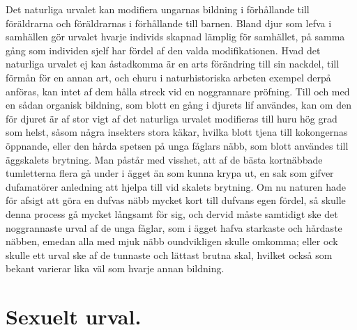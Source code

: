 Det naturliga urvalet kan modifiera ungarnas bildning i förhållande till föräldrarna och föräldrarnas i förhållande till barnen. Bland djur som lefva i samhällen gör urvalet hvarje individs skapnad lämplig för samhället, på samma gång som individen sjelf har fördel af den valda modifikationen. Hvad det naturliga urvalet ej kan åstadkomma är en arts förändring till sin nackdel, till förmån för en annan art, och ehuru i naturhistoriska arbeten exempel derpå anföras, kan intet af dem hålla streck vid en noggrannare pröfning. Till och med en sådan organisk bildning, som blott en gång i djurets lif användes, kan om den för djuret är af stor vigt af det naturliga urvalet modifieras till huru hög grad som helst, såsom några insekters stora käkar, hvilka blott tjena till kokongernas öppnande, eller den hårda spetsen på unga fåglars näbb, som blott användes till äggskalets brytning. Man påstår med visshet, att af de bästa kortnäbbade tumletterna flera gå under i ägget än som kunna krypa ut, en sak som gifver dufamatörer anledning att hjelpa till vid skalets brytning. Om nu naturen hade för afsigt att göra en dufvas näbb mycket kort till dufvans egen fördel, så skulle denna process gå mycket långsamt för sig, och dervid måste samtidigt ske det noggrannaste urval af de unga fåglar, som i ägget hafva starkaste och hårdaste näbben, emedan alla med mjuk näbb oundvikligen skulle omkomma; eller ock skulle ett urval ske af de tunnaste och lättast brutna skal, hvilket också som bekant varierar lika väl som hvarje annan bildning.



\section{Sexuelt urval.}

